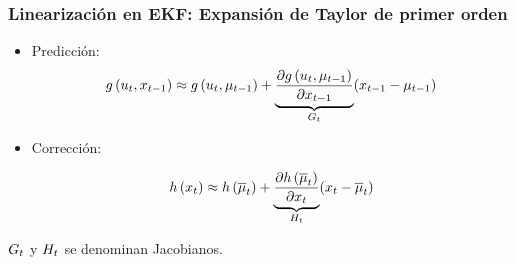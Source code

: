 \begin{frame}
    \frametitle{Linearización en EKF: Expansión de Taylor de primer orden}
    
    
    \begin{itemize}
        \item Predicción:
        \begin{equation*}
            g\left( u_{t}, x_{t-1} \right) \approx g\left( u_{t}, \mu_{t-1} \right) + \underbrace{\dfrac{\partial g\left( u_{t}, \mu_{t-1} \right)}{\partial x_{t-1}}}_{G_{t}} (x_{t-1} - \mu_{t-1}) 
        \end{equation*}
            
        \item Corrección:
        
        \begin{equation*}
            h\left( x_{t} \right) \approx h\left( \overline{\mu}_{t} \right) + \underbrace{\dfrac{\partial h\left( \overline{\mu}_{t} \right)}{\partial x_{t}}}_{H_{t}} (x_{t} - \overline{\mu}_{t})
        \end{equation*}
        
    \end{itemize}
    
    $G_{t}$ y $H_{t}$ se denominan Jacobianos.
\end{frame}


